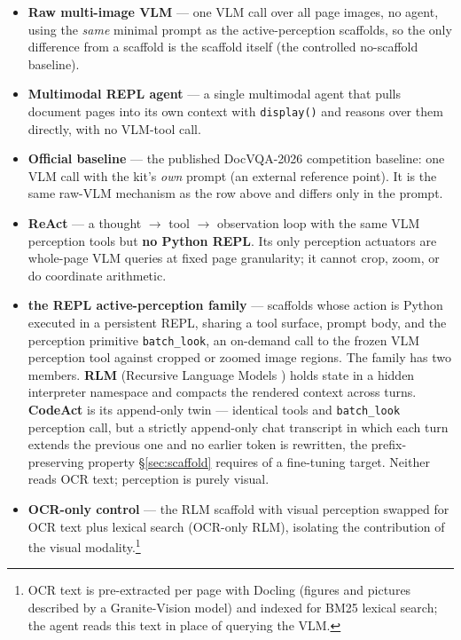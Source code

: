 \begin{itemize}
\item \textbf{Raw multi-image VLM} --- one VLM call over all page images, no agent, using the \emph{same} minimal prompt as the active-perception scaffolds, so the only difference from a scaffold is the scaffold itself (the controlled no-scaffold baseline).
\item \textbf{Multimodal REPL agent} --- a single multimodal agent that pulls document pages into its own context with \texttt{display()} and reasons over them directly, with no VLM-tool call.
\item \textbf{Official baseline} --- the published DocVQA-2026 competition baseline: one VLM call with the kit's \emph{own} prompt (an external reference point). It is the same raw-VLM mechanism as the row above and differs only in the prompt.
\item \textbf{ReAct} --- a thought $\rightarrow$ tool $\rightarrow$ observation loop with the same VLM perception tools but \textbf{no Python REPL}. Its only perception actuators are whole-page VLM queries at fixed page granularity; it cannot crop, zoom, or do coordinate arithmetic.
\item \textbf{the REPL active-perception family} --- scaffolds whose action is Python executed in a persistent REPL, sharing a tool surface, prompt body, and the perception primitive \texttt{batch\_look}, an on-demand call to the frozen VLM perception tool against cropped or zoomed image regions. The family has two members. \textbf{RLM} (Recursive Language Models \citep{rlm}) holds state in a hidden interpreter namespace and compacts the rendered context across turns. \textbf{CodeAct} is its append-only twin --- identical tools and \texttt{batch\_look} perception call, but a strictly append-only chat transcript in which each turn extends the previous one and no earlier token is rewritten, the prefix-preserving property \S\ref{sec:scaffold} requires of a fine-tuning target. Neither reads OCR text; perception is purely visual.
\item \textbf{OCR-only control} --- the RLM scaffold with visual perception swapped for OCR text plus lexical search (OCR-only RLM), isolating the contribution of the visual modality.\footnote{OCR text is pre-extracted per page with Docling (figures and pictures described by a Granite-Vision model) and indexed for BM25 lexical search; the agent reads this text in place of querying the VLM.}
\end{itemize}

